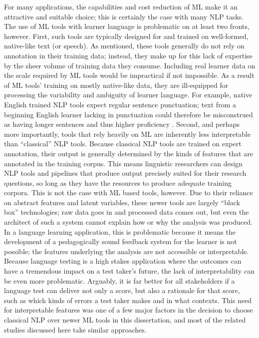 For many applications, the capabilities and cost reduction of ML make it an attractive and suitable choice; this is certainly the case with many NLP tasks. The use of ML tools with learner language is problematic on at least two fronts, however. First, such tools are typically designed for and trained on well-formed, native-like text (or speech). As mentioned, these tools generally do not rely on annotation in their training data; instead, they make up for this lack of expertise by the sheer volume of training data they consume. Including real learner data on the scale required by ML tools would be impractical if not impossible. As a result of ML tools' training on mostly native-like data, they are ill-equipped for processing the variability and ambiguity of learner language. For example, native English trained NLP tools expect regular sentence punctuation; text from a beginning English learner lacking in punctuation could therefore be misconstrued as having longer sentences and thus higher proficiency \cite{MeurersDickinson2017}. Second, and perhaps more importantly, tools that rely heavily on ML are inherently less interpretable than ``classical'' NLP tools. Because classical NLP tools are trained on expert annotation, their output is generally determined by the kinds of features that are annotated in the training corpus. This means linguistic researchers can design NLP tools and pipelines that produce output precisely suited for their research questions, so long as they have the resources to produce adequate training corpora. This is not the case with ML based tools, however. Due to their reliance on abstract features and latent variables, these newer tools are largely ``black box'' technologies; raw data goes in and processed data comes out, but even the architect of such a system cannot explain how or why the analysis was produced. In a language learning application, this is problematic because it means the development of a pedagogically sound feedback system for the learner is not possible; the features underlying the analysis are not accessible or interpretable. Because language testing is a high stakes application where the outcomes can have a tremendous impact on a test taker's future, the lack of interpretability can be even more problematic. Arguably, it is far better for all stakeholders if a language test can deliver not only a score, but also a rationale for that score, such as which kinds of errors a test taker makes and in what contexts. This need for interpretable features was one of a few major factors in the decision to choose classical NLP over newer ML tools in this dissertation, and most of the related studies discussed here take similar approaches.


